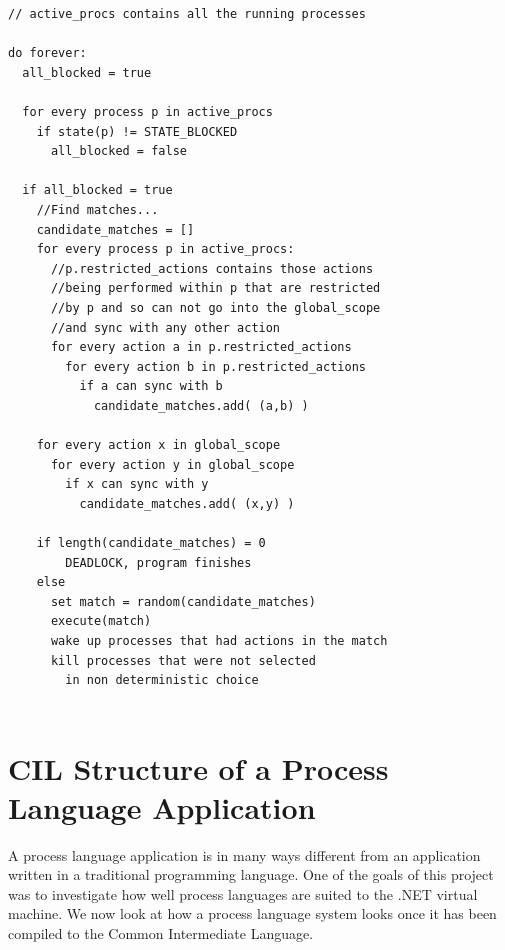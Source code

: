 	\begin{lstlisting}[caption=The scheduler algorithm, label=lst:scheduler]
// active_procs contains all the running processes

do forever:
  all_blocked = true
  
  for every process p in active_procs
    if state(p) != STATE_BLOCKED
      all_blocked = false
    
  if all_blocked = true
    //Find matches...      
    candidate_matches = []
    for every process p in active_procs:
      //p.restricted_actions contains those actions
      //being performed within p that are restricted 
      //by p and so can not go into the global_scope 
      //and sync with any other action
      for every action a in p.restricted_actions
        for every action b in p.restricted_actions
          if a can sync with b
            candidate_matches.add( (a,b) )
		
    for every action x in global_scope
      for every action y in global_scope
        if x can sync with y
          candidate_matches.add( (x,y) )
    
    if length(candidate_matches) = 0
    	DEADLOCK, program finishes
    else
      set match = random(candidate_matches)
      execute(match)
      wake up processes that had actions in the match
      kill processes that were not selected 
        in non deterministic choice
	
	\end{lstlisting}
	

\section{CIL Structure of a Process Language Application}\label{cil_structure}

	A process language application is in many ways different from an application
	written in a traditional programming language. One of the goals of this  
	project was to investigate how well process languages are suited to the .NET
	virtual machine. We now look at how a process language system looks once it 
	has been compiled to the Common Intermediate Language.
	
